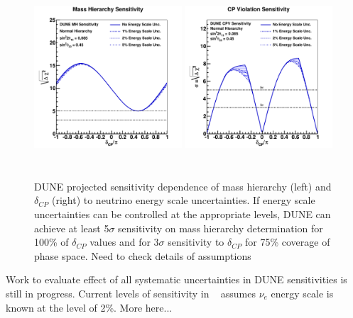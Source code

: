 \begin{figure}[h!]
\centering
\includegraphics[width=0.49\textwidth,height=6.7cm]{figures/mh_230ktmwyear_varyesyst}
\includegraphics[width=0.49\textwidth,height=6.7cm]{figures/cpv_890ktmwyear_varyesyst}
\label{fig:global_escale_sens}
  \caption{DUNE projected sensitivity dependence of mass hierarchy (left) and $\delta_{CP}$ 
(right) to neutrino energy scale uncertainties. 
If energy scale uncertainties can be controlled at the appropriate levels, DUNE can achieve 
at least 5$\sigma$ sensitivity on mass hierarchy determination for 100\% of $\delta_{CP}$ values and
for 3$\sigma$ sensitivity to  $\delta_{CP}$ for 75\% coverage of phase space.
{\color{red} 
Need to check details of assumptions
}
}
\end{figure}

Work to evaluate effect of all systematic uncertainties in DUNE sensitivities is still in progress. Current levels of sensitivity in ~\cite{DuneCDR} assumes
$\nu_e$ energy scale is known at the level of 2\%. 
More here...




